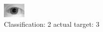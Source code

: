 \begin{figure}[h!]
\begin{center}
\includegraphics[width=0.60\columnwidth]{figures/ID1079_class_2_target_3.png}
\end{center}
\caption{ Classification: 2 actual target: 3}
\label{fig:ID1079_class_2_target_3}
\end{figure}
